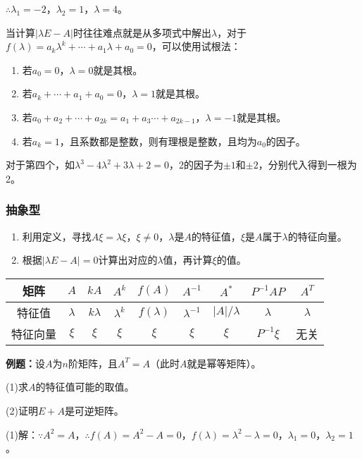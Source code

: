 \documentclass[UTF8, 12pt]{ctexart}
\begin{document}
$\therefore\lambda_1=-2$，$\lambda_2=1$，$\lambda=4$。

当计算$\vert\lambda E-A\vert$时往往难点就是从多项式中解出$\lambda$，对于$f(\lambda)=a_k\lambda^k+\cdots+a_1\lambda+a_0=0$，可以使用试根法：

\begin{enumerate}
    \item 若$a_0=0$，$\lambda=0$就是其根。
    \item 若$a_k+\cdots+a_1+a_0=0$，$\lambda=1$就是其根。
    \item 若$a_0+a_2+\cdots+a_{2k}=a_1+a_3\cdots+a_{2k-1}$，$\lambda=-1$就是其根。
    \item 若$a_k=1$，且系数都是整数，则有理根是整数，且均为$a_0$的因子。
\end{enumerate}

对于第四个，如$\lambda^3-4\lambda^2+3\lambda+2=0$，2的因子为$\pm1$和$\pm2$，分别代入得到一根为2。

\subsubsection{抽象型}

\begin{enumerate}
    \item 利用定义，寻找$A\xi=\lambda\xi$，$\xi\neq0$，$\lambda$是$A$的特征值，$\xi$是$A$属于$\lambda$的特征向量。
    \item 根据$\vert\lambda E-A\vert=0$计算出对应的$\lambda$值，再计算$\xi$的值。
\end{enumerate}

\begin{tabular}{|c|c|c|c|c|c|c|c|c|}
    \hline
    矩阵 & $A$ & $kA$ & $A^k$ & $f(A)$ & $A^{-1}$ & $A^*$ & $P^{-1}AP$ & $A^T$ \\ \hline
    特征值 & $\lambda$ & $k\lambda$ & $\lambda^k$ & $f(\lambda)$ & $\lambda^{-1}$ & $\vert A\vert/\lambda$ & $\lambda$ & $\lambda$ \\ \hline
    特征向量 & $\xi$ & $\xi$ & $\xi$ & $\xi$ & $\xi$ & $\xi$ & $P^{-1}\xi$ & 无关 \\
    \hline
\end{tabular} \medskip

\textbf{例题：}设$A$为$n$阶矩阵，且$A^T=A$（此时$A$就是幂等矩阵）。

(1)求$A$的特征值可能的取值。

(2)证明$E+A$是可逆矩阵。

(1)解：$\because A^2=A$，$\therefore f(A)=A^2-A=0$，$f(\lambda)=\lambda^2-\lambda=0$，$\lambda_1=0$，$\lambda_2=1$。
\end{document}
